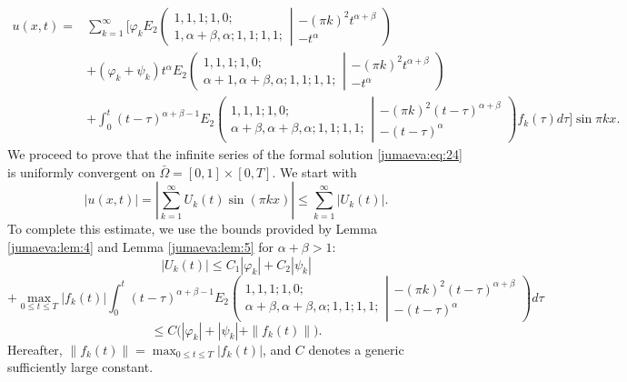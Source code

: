 \documentclass{amsart}
\numberwithin{equation}{section}
\begin{document}
\begin{align}
    u(x,t)=&\sum_{k=1}^\infty\Bigg[\varphi_k E_2\left( \begin{array}{c}1, 1, 1; 1, 0; \\1, \alpha+\beta, \alpha ; 1, 1; 1, 1; \end{array}\left| \begin{array}{c}-(\pi k)^2 t^{\alpha+\beta} \\-t^\alpha \end{array}\right.\right) \nonumber \\
  &+(\varphi_k+\psi_k)t^\alpha E_2\left( \begin{array}{c}1, 1, 1; 1, 0; \\\alpha+1, \alpha+\beta, \alpha ; 1, 1; 1, 1; \end{array}\left| \begin{array}{c}-(\pi k)^2 t^{\alpha+\beta} \\-t^\alpha\end{array}\right.\right) \nonumber \\
& +\int_0^t (t-\tau)^{\alpha+\beta-1} E_2\left( \begin{array}{c}1, 1, 1; 1, 0; \\\alpha+\beta, \alpha+\beta, \alpha ; 1, 1; 1, 1;\end{array}\left| \begin{array}{c} -(\pi k)^2 (t-\tau)^{\alpha+\beta}\\-(t-\tau)^\alpha\end{array}\right.\right) f_k(\tau) d\tau \Bigg]\sin{\pi k x}.\label{jumaeva:eq:24}
\end{align}
We proceed to prove that the infinite series of the formal solution \eqref{jumaeva:eq:24} is uniformly convergent on 
$\bar\Omega=[0,1]\times[0,T]$. We start with
\begin{equation}
|u(x,t)|=\left|\sum_{k=1}^\infty U_k(t)\sin(\pi kx)\right|
\le \sum_{k=1}^\infty |U_k(t)|.\label{jumaeva:eq:25}
\end{equation}
To complete this estimate, we use the bounds provided by Lemma \ref{jumaeva:lem:4} and Lemma \ref{jumaeva:lem:5} for $\alpha+\beta>1$:
\begin{equation*}
    |U_k(t)|\le C_1|\varphi_k|+C_2|\psi_k|
\end{equation*}
\begin{equation*}
    +\max_{0\leq t\leq T} |f_k(t)|\int_0^t (t-\tau)^{\alpha+\beta-1} E_2\left( 
\begin{array}{c}
1, 1, 1; 1, 0; \\
\alpha+\beta, \alpha+\beta, \alpha ; 1, 1; 1, 1; 
\end{array}
\left| 
\begin{array}{c}
-(\pi k)^2 (t-\tau)^{\alpha+\beta} \\
-(t-\tau)^\alpha 
\end{array}
\right.
\right)  d\tau
\end{equation*}
\begin{equation}
\leq C \bigg(|\varphi_k| +|\psi_k|+\|f_k(t)\|\bigg).\label{jumaeva:eq:26}
\end{equation}
Hereafter, $\|f_k(t)\|=\max_{0\leq t\leq T}|f_k(t)|$, and  $C$ denotes a generic sufficiently large constant.
\end{document}
